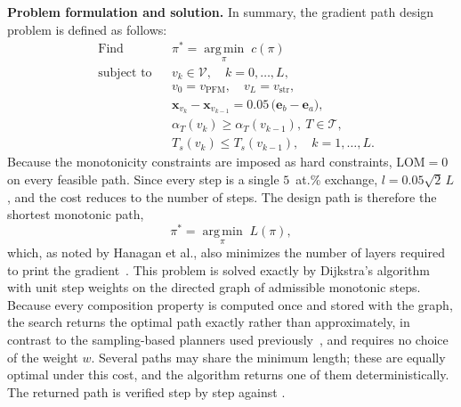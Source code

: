 \textbf{Problem formulation and solution.} In summary, the gradient path design
problem is defined as follows:
\begin{equation}
\begin{aligned}
&\text{Find}       && \pi^{*} = \operatorname*{arg\,min}_{\pi}\; c(\pi)\\
&\text{subject to} && v_k \in \mathcal{V}, \quad k = 0,\dots,L,\\
&                  && v_0 = v_{\mathrm{PFM}}, \quad v_L = v_{\mathrm{str}},\\
&                  && \mathbf{x}_{v_k}-\mathbf{x}_{v_{k-1}} = 0.05\,\bigl(\mathbf{e}_b-\mathbf{e}_a\bigr),\\
&                  && \alpha_T(v_k) \ge \alpha_T(v_{k-1}),\ T\in\mathcal{T},\\
&                  && T_s(v_k) \le T_s(v_{k-1}), \quad k = 1,\dots,L.
\end{aligned}
\label{eq:problem}
\end{equation}
Because the monotonicity constraints are imposed as hard constraints,
\(\mathrm{LOM}=0\) on every feasible path. Since every step is a single \(5\)~at.\%
exchange, \(l = 0.05\sqrt{2}\,L\), and the cost reduces to the number of steps. The
design path is therefore the shortest monotonic path,
\begin{equation}
\pi^{*} = \operatorname*{arg\,min}_{\pi}\; L(\pi),
\label{eq:shortest}
\end{equation}
which, as noted by Hanagan et al., also minimizes the number of layers required to
print the gradient~\cite{hanagan2025sfe}. This problem is solved exactly by
Dijkstra's algorithm~\cite{dijkstra1959note} with unit step weights on the directed
graph of admissible monotonic steps. Because every composition property is computed
once and stored with the graph, the search returns the optimal path exactly rather
than approximately, in contrast to the sampling-based planners used
previously~\cite{kirk2018gradient,kirk2021monotonic}, and requires no choice of the
weight \(w\). Several paths may share the minimum length; these are equally optimal
under this cost, and the algorithm returns one of them deterministically. The
returned path is verified step by step against .
